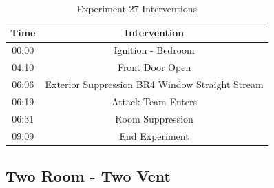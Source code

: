 \documentclass[12pt,oneside]{book}
\begin{document}
\begin{table}[H]
	\centering
	\caption{Experiment 27 Interventions}
	\begin{tabular}{|c|c|} 
		\hline
		Time & Intervention \\ \hline \hline
		00:00 & Ignition - Bedroom \\ \hline
		04:10 & Front Door Open \\ \hline
		06:06 & Exterior Suppression BR4 Window Straight Stream \\ \hline
		06:19 & Attack Team Enters\\ \hline
		06:31 & Room Suppression \\ \hline 
		09:09 & End Experiment\\ \hline
	\end{tabular}
	\label{Table:Exp27Interventions}
\end{table}

\clearpage

\subsection{Two Room - Two Vent}

\end{document}
